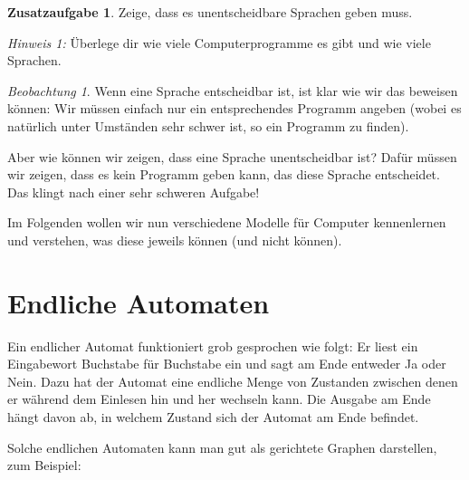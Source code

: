 \documentclass[a4paper,ngerman,12pt]{scrartcl}
\theoremstyle{definition}
\newtheorem{zaufg}{Zusatzaufgabe}
\theoremstyle{plain}
\theoremstyle{remark}
\newtheorem{beob}[defn]{Beobachtung}
\begin{document}
\begin{zaufg}
	Zeige, dass es unentscheidbare Sprachen geben muss. 
	
	\textit{Hinweis 1:} Überlege dir wie viele Computerprogramme es gibt und wie viele Sprachen.	
\end{zaufg}

\begin{beob}
	Wenn eine Sprache entscheidbar ist, ist klar wie wir das beweisen können: Wir müssen einfach nur ein entsprechendes Programm angeben (wobei es natürlich unter Umständen sehr schwer ist, so ein Programm zu finden).
	
	Aber wie können wir zeigen, dass eine Sprache unentscheidbar ist? Dafür müssen wir zeigen, dass es kein Programm geben kann, das diese Sprache entscheidet. Das klingt nach einer sehr schweren Aufgabe!
\end{beob}

Im Folgenden wollen wir nun verschiedene Modelle für Computer kennenlernen und verstehen, was diese jeweils können (und nicht können).

\section{Endliche Automaten}

Ein endlicher Automat funktioniert grob gesprochen wie folgt: Er liest ein Eingabewort Buchstabe für Buchstabe ein und sagt am Ende entweder Ja oder Nein. Dazu hat der Automat eine endliche Menge von Zustanden zwischen denen er während dem Einlesen hin und her wechseln kann. Die Ausgabe am Ende hängt davon ab, in welchem Zustand sich der Automat am Ende befindet.

Solche endlichen Automaten kann man gut als gerichtete Graphen darstellen, zum Beispiel:
\begin{center}
\end{center}
\end{document}
